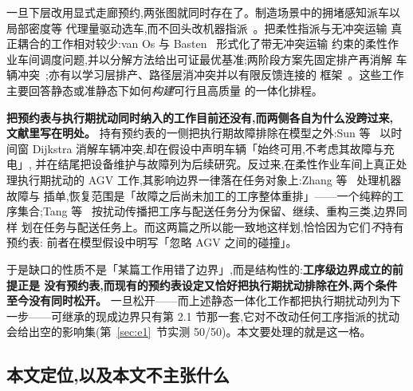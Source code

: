 \documentclass[manuscript,screen,review]{acmart}
\newcommand{\NPairs}{50}
\newcommand{\PassMiss}{\NPairs/\NPairs}      %
\begin{document}
一旦下层改用显式走廊预约,两张图就同时存在了。制造场景中的拥堵感知派车以局部密度等
代理量驱动选车,而不回头改机器指派~\cite{kim2026congestion}。把柔性指派与无冲突运输
真正耦合的工作相对较少:van Os 与 Basten~\cite{vanos2026exact} 形式化了带无冲突运输
约束的柔性作业车间调度问题,并以分解方法给出可证最优基准;两阶段方案先固定排产再消解
车辆冲突~\cite{sun2023integrated};亦有以学习层排产、路径层消冲突并以有限反馈连接的
框架~\cite{li2026framework}。这些工作主要回答静态或准静态下如何\emph{构建}可行且高质量
的一体化排程。

\textbf{把预约表与执行期扰动同时纳入的工作目前还没有,而两侧各自为什么没跨过来,
文献里写在明处。} 持有预约表的一侧把执行期故障排除在模型之外:Sun 等~\cite{sun2023integrated}
以时间窗 Dijkstra 消解车辆冲突,却在假设中声明车辆「始终可用,不考虑其故障与充电」,
并在结尾把设备维护与故障列为后续研究。反过来,在柔性作业车间上真正处理执行期扰动的
AGV 工作,其影响边界一律落在任务对象上:Zhang 等~\cite{zhang2023energy} 处理机器故障与
插单,恢复范围是「故障之后尚未加工的工序整体重排」——一个纯粹的工序集合;Tang
等~\cite{tang2026dynamic} 按扰动传播把工序与配送任务分为保留、继续、重构三类,边界同样
划在任务与配送任务上。而这两篇之所以能一致地这样划,恰恰因为它们\emph{不}持有预约表:
前者在模型假设中明写「忽略 AGV 之间的碰撞」。

于是缺口的性质不是「某篇工作用错了边界」,而是结构性的:\textbf{工序级边界成立的前提正是
没有预约表,而现有的预约表设定又恰好把执行期扰动排除在外,两个条件至今没有同时松开。}
一旦松开——而上述静态一体化工作都把执行期扰动列为下一步——可继承的现成边界只有第
2.1 节那一套,它对不改动任何工序指派的扰动会给出空的影响集(第~\ref{sec:e1}~节实测
\PassMiss)。本文要处理的就是这一格。

\subsection{本文定位,以及本文不主张什么}
\label{sec:rw_claim}
\end{document}
